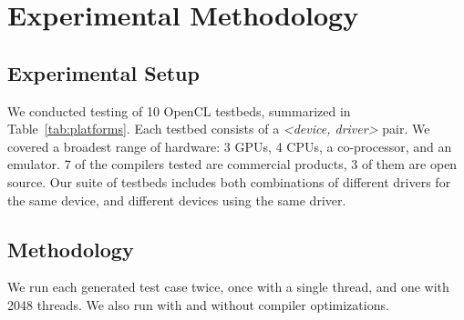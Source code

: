 \section{Experimental Methodology}

\subsection{Experimental Setup}

\begin{table*}[t!]
  \scriptsize %
  \centering %
  
  \caption{%
    OpenCL testbeds, the time spent in automated testing, and the number of bug reports submitted to date.%
  }
  \label{tab:platforms}
\end{table*}

We conducted testing of 10 OpenCL testbeds, summarized in Table~\ref{tab:platforms}. Each testbed consists of a \emph{<device, driver>} pair. We covered a broadest range of hardware: 3 GPUs, 4 CPUs, a co-processor, and an emulator. 7 of the compilers tested are commercial products, 3 of them are open source. Our suite of testbeds includes both combinations of different drivers for the same device, and different devices using the same driver.

\subsection{Methodology}

We run each generated test case twice, once with a single thread, and one with 2048 threads. We also run with and without compiler optimizations.